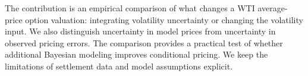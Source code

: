 The contribution is an empirical comparison of what changes a
WTI average-price option valuation: integrating volatility
uncertainty or changing the volatility input. We also distinguish
uncertainty in model prices from uncertainty in observed pricing
errors. The comparison provides a practical test of whether additional
Bayesian modeling improves conditional pricing. We keep the
limitations of settlement data and model assumptions explicit.
